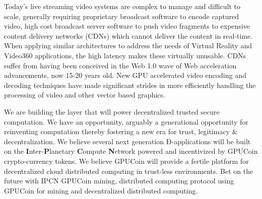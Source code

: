 \documentclass{article}
\begin{document}
Today’s live streaming video systems are complex to manage and difficult to scale, generally requiring proprietary broadcast software to encode captured video, high cost broadcast server software to push video fragments to expensive content delivery networks (CDNs) which cannot deliver the content in real-time.  When applying similar architectures to address the needs of Virtual Reality and Video360 applications, the high latency makes these virtually unusable.  CDNs suffer from having been conceived in the Web 1.0 wave of Web acceleration advancements, now 15-20 years old.  New GPU accelerated video encoding and decoding techniques have made significant strides in more efficiently handling the processing of video and other vector based graphics.  

We are building the layer that will power decentralized trusted secure computation. We have an opportunity, arguably a generational opportunity for reinventing computation thereby fostering a new era for trust, legitimacy \& decentralization. We believe several next generation Ð-applications will be built on the \textbf{I}nter-\textbf{P}lanetary \textbf{C}ompute \textbf{N}etwork powered and incentivized by GPUCoin crypto-currency tokens. We believe GPUCoin will provide a fertile platform for decentralized cloud distributed computing in trust-less environments. Bet on the future with IPCN GPUCoin mining, distributed computing protocol using GPUCoin for mining and decentralized distributed computing.





\newpage
\listoffigures
\newpage 
\listoftables
\newpage 

\end{document}
